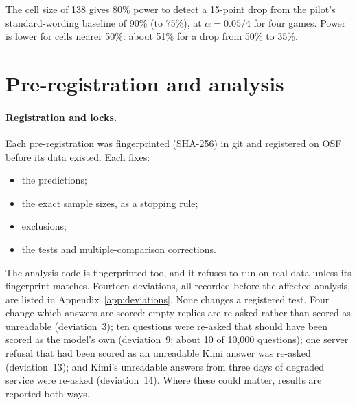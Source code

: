 \documentclass[10pt]{article}
\theoremstyle{definition}
\theoremstyle{remark}
\begin{document}
\noindent The cell size of 138 gives 80\% power to detect a 15-point drop from the pilot's
standard-wording baseline of 90\% (to 75\%), at $\alpha=0.05/4$ for four games. Power is lower
for cells nearer 50\%: about 51\% for a drop from 50\% to 35\%.

\section{Pre-registration and analysis}\label{sec:analysis}

\paragraph{Registration and locks.} Each pre-registration was fingerprinted (SHA-256) in git and
registered on OSF before its data existed. Each fixes:
\begin{itemize}
\item the predictions;
\item the exact sample sizes, as a stopping rule;
\item exclusions;
\item the tests and multiple-comparison corrections.
\end{itemize}
The analysis code is fingerprinted too, and it refuses to run on real data unless its
fingerprint matches. Fourteen deviations, all recorded before the affected analysis, are listed in
Appendix~\ref{app:deviations}. None changes a registered test. Four change which answers are
scored: empty replies are re-asked rather than scored as unreadable (deviation~3); ten questions
were re-asked that should have been scored as the model's own (deviation~9; about 10 of 10{,}000
questions); one server refusal that had been scored as an unreadable Kimi answer was re-asked
(deviation~13); and Kimi's unreadable answers from three days of degraded service were re-asked
(deviation~14). Where these could matter, results are reported both ways.
\end{document}
